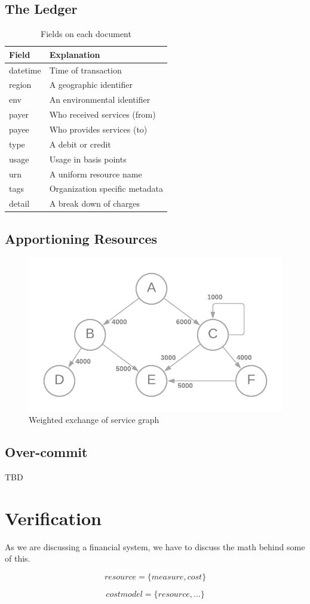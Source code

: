 \documentclass[10pt, a4paper, twocolumn]{article}
\begin{document}
  \subsection*{The Ledger}

    \begin{table}[H]
      \centering
      \begin{tabular}{ l|l }
        Field & Explanation \\
        \hline
        datetime & Time of transaction \\
        region & A geographic identifier \\
        env & An environmental identifier \\
        payer & Who received services (from) \\
        payee & Who provides services (to) \\
        type & A debit or credit \\
        usage & Usage in basis points \\
        urn & A uniform resource name \\
        tags & Organization specific metadata \\
        detail & A break down of charges
      \end{tabular}
      \caption{Fields on each document}
      \label{table:1}
    \end{table}


  \subsection*{Apportioning Resources}

    \begin{figure}[H]
      \centering
      \includegraphics[width=\linewidth]{./truth-and-reconciliation-graph-weighted.png}
      \caption{Weighted exchange of service graph}
      \label{figure:3}
    \end{figure}

  \subsection*{Over-commit}

    TBD


\section*{Verification}

  As we are discussing a financial system, we have to discuss the math behind some of this.

  \[ resource = \{ measure, cost \} \]

  \[ costmodel = \{ resource, ... \} \]
\end{document}
